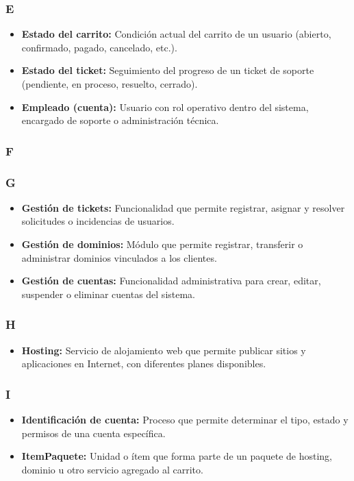 \subsubsection*{E}
\begin{itemize}
    \item \textbf{Estado del carrito:} Condición actual del carrito de un usuario (abierto, confirmado, pagado, cancelado, etc.).
    \item \textbf{Estado del ticket:} Seguimiento del progreso de un ticket de soporte (pendiente, en proceso, resuelto, cerrado).
    \item \textbf{Empleado (cuenta):} Usuario con rol operativo dentro del sistema, encargado de soporte o administración técnica.
\end{itemize}

\subsubsection*{F}

\subsubsection*{G}
\begin{itemize}
    \item \textbf{Gestión de tickets:} Funcionalidad que permite registrar, asignar y resolver solicitudes o incidencias de usuarios.
    \item \textbf{Gestión de dominios:} Módulo que permite registrar, transferir o administrar dominios vinculados a los clientes.
    \item \textbf{Gestión de cuentas:} Funcionalidad administrativa para crear, editar, suspender o eliminar cuentas del sistema.
\end{itemize}

\subsubsection*{H}
\begin{itemize}
\item \textbf {Hosting:} Servicio de alojamiento web que permite publicar sitios y aplicaciones en Internet, con diferentes planes disponibles.
\end{itemize}

\subsubsection*{I}
\begin{itemize}
    \item \textbf {Identificación de cuenta:} Proceso que permite determinar el tipo, estado y permisos de una cuenta específica.
    \item \textbf {ItemPaquete:} Unidad o ítem que forma parte de un paquete de hosting, dominio u otro servicio agregado al carrito.
\end{itemize}


